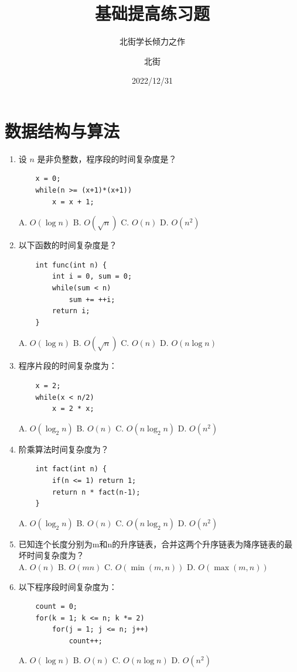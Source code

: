\documentclass[lang=cn,newtx,10pt,scheme=chinese]{../../elegantbook}
\title{基础提高练习题}
\subtitle{北街学长倾力之作}
\author{北街}
\date{2022/12/31}
\begin{document}
\maketitle
\frontmatter

\tableofcontents

\mainmatter

\chapter{数据结构与算法}
\begin{enumerate}
    \item 设 $n$ 是非负整数，程序段的时间复杂度是？
    \begin{verbatim}
    x = 0;
    while(n >= (x+1)*(x+1))
        x = x + 1;
    \end{verbatim}
    A. $O(\log n)$ \quad B. $O(\sqrt{n})$ \quad C. $O(n)$ \quad D. $O(n^2)$

    \item 以下函数的时间复杂度是？
    \begin{verbatim}
    int func(int n) {
        int i = 0, sum = 0;
        while(sum < n)
            sum += ++i;
        return i;
    }
    \end{verbatim}
    A. $O(\log n)$ \quad B. $O(\sqrt{n})$ \quad C. $O(n)$ \quad D. $O(n\log n)$

    \item 程序片段的时间复杂度为：
    \begin{verbatim}
    x = 2;
    while(x < n/2)
        x = 2 * x;
    \end{verbatim}
    A. $O(\log_2 n)$ \quad B. $O(n)$ \quad C. $O(n \log_2 n)$ \quad D. $O(n^2)$

    \item 阶乘算法时间复杂度为？
    \begin{verbatim}
    int fact(int n) {
        if(n <= 1) return 1;
        return n * fact(n-1);
    }
    \end{verbatim}
    A. $O(\log_2 n)$ \quad B. $O(n)$ \quad C. $O(n \log_2 n)$ \quad D. $O(n^2)$

    \item 已知连个长度分别为m和n的升序链表，合并这两个升序链表为降序链表的最坏时间复杂度为？\\
    A. $O(n)$ \quad B. $O(mn)$ \quad C. $O(\min(m,n))$ \quad D. $O(\max(m,n))$

    \item 以下程序段时间复杂度为：
    \begin{verbatim}
    count = 0;
    for(k = 1; k <= n; k *= 2)
        for(j = 1; j <= n; j++)
            count++;
    \end{verbatim}
    A. $O(\log n)$ \quad B. $O(n)$ \quad C. $O(n \log n)$ \quad D. $O(n^2)$


\end{enumerate}
\end{document}
